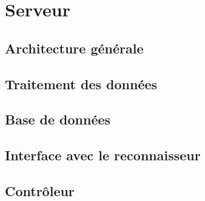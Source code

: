 \chapter{Serveur}

\section{Architecture générale}

\section{Traitement des données}

\section{Base de données}

\section{Interface avec le reconnaisseur}

\section{Contrôleur}